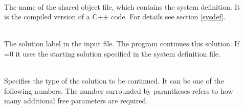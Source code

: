 \documentclass[10pt,a4paper]{ddedoc}
\begin{document}
\begin{description}
\item[] ~\\
The name of the shared object file,
which contains the system definition. It is the compiled version of a C++
code. For details see section \ref{sysdef}.
%
\item[] ~\\
The solution label in the input file. The program continues this
solution. If =0 it uses the starting solution specified 
in the system definition file.
%
\item[] ~\\
Specifies the type of the solution to be continued. It can be one of the following numbers.
The number surrounded by parantheses refers to how many additional free
parameters are required.


\end{description}
\end{document}
